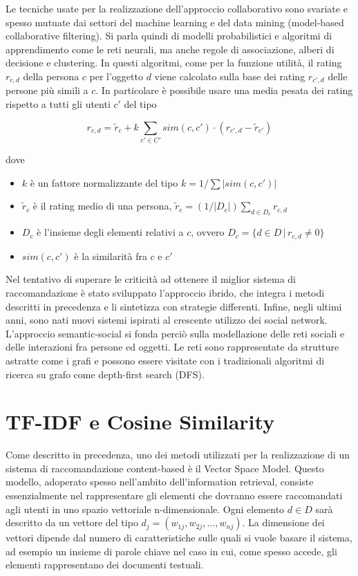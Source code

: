\documentclass[Lau,binding=0.6cm,noexaminfo,oneside]{sapthesis}
\begin{document}
Le tecniche usate per la realizzazione dell'approccio collaborativo sono svariate e spesso mutuate dai settori del machine learning e del data mining (model-based collaborative filtering). Si parla quindi di modelli probabilistici e algoritmi di apprendimento come le reti neurali, ma anche regole di associazione, alberi di decisione e clustering.
In questi algoritmi, come per la funzione utilità, il rating $r_{c,d}$ della persona $c$ per l'oggetto $d$ viene calcolato sulla base dei rating $r_{c',d}$ delle persone più simili a $c$. In particolare è possibile usare una media pesata dei rating rispetto a tutti gli utenti $c'$ del tipo

\[
r_{c,d} = \widetilde{r}_c + k \sum_{c' \in C'} sim(c,c') \cdot (r_{c',d} - \widetilde{r}_{c'})
\]

dove

\begin{itemize}
  \item $k$ è un fattore normalizzante del tipo $k = 1 / \sum |sim(c,c')|$
  \item $\widetilde{r}_c$ è il rating medio di una persona, $\widetilde{r}_c = (1/|D_c|) \sum_{d \in D_c} r_{c,d}$
  \item $D_c$ è l'insieme degli elementi relativi a $c$, ovvero $D_c = \{d \in D \, | \, r_{c,d} \neq 0\}$
  \item $sim(c,c')$ è la similarità fra $c$ e $c'$
\end{itemize}

\medskip

Nel tentativo di superare le criticità ad ottenere il miglior sistema di raccomandazione è stato sviluppato l'approccio ibrido, che integra i metodi descritti in precedenza e li sintetizza con strategie differenti. Infine, negli ultimi anni, sono nati nuovi sistemi ispirati al crescente utilizzo dei social network.
L'approccio semantic-social si fonda perciò sulla modellazione delle reti sociali e delle interazioni fra persone ed oggetti. Le reti sono rappresentate da strutture astratte come i grafi e possono essere visitate con i tradizionali algoritmi di ricerca su grafo come depth-first search (DFS).\medskip

\section{TF-IDF e Cosine Similarity}

Come descritto in precedenza, uno dei metodi utilizzati per la realizzazione di un sistema di raccomandazione content-based è il Vector Space Model. Questo modello,  adoperato spesso nell'ambito dell'information retrieval, consiste essenzialmente nel rappresentare gli elementi che dovranno essere raccomandati agli utenti in uno spazio vettoriale n-dimensionale.
Ogni elemento $d \in D$ sarà descritto da un vettore del tipo $d_j = (w_{1j}, w_{2j}, ..., w_{nj})$. La dimensione dei vettori dipende dal numero di caratteristiche sulle quali si vuole basare il sistema, ad esempio un insieme di parole chiave nel caso in cui, come spesso accede, gli elementi rappresentano dei documenti testuali.\medskip
\end{document}
